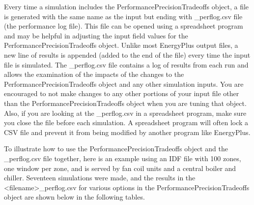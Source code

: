 Every time a simulation includes the PerformancePrecisionTradeoffs object, a file is generated with the same name as the input but ending with \_perflog.csv file (the performance log file). This file can be opened using a spreadsheet program and may be helpful in adjusting the input field values for the PerformancePrecisionTradeoffs object. Unlike most EnergyPlus output files, a new line of results is appended (added to the end of the file) every time the input file is simulated. The \_perflog.csv file contains a log of results from each run and allows the examination of the impacts of the changes to the PerformancePrecisionTradeoffs object and any other simulation inputs. You are encouraged to not make changes to any other portions of your input file other than the PerformancePrecisionTradeoffs object when you are tuning that object. Also, if you are looking at the \_perflog.csv in a spreadsheet program, make sure you close the file before each simulation. A spreadsheet program will often lock a CSV file and prevent it from being modified by another program like EnergyPlus.

To illustrate how to use the PerformancePrecisionTradeoffs object and the \_perflog.csv file together, here is an example using an IDF file with 100 zones, one window per zone, and is served by fan coil units and a central boiler and chiller. Seventeen simulations were made, and the results in the <filename>\_perflog.csv for various options in the PerformancePrecisionTradeoffs object are shown below in the following tables.


